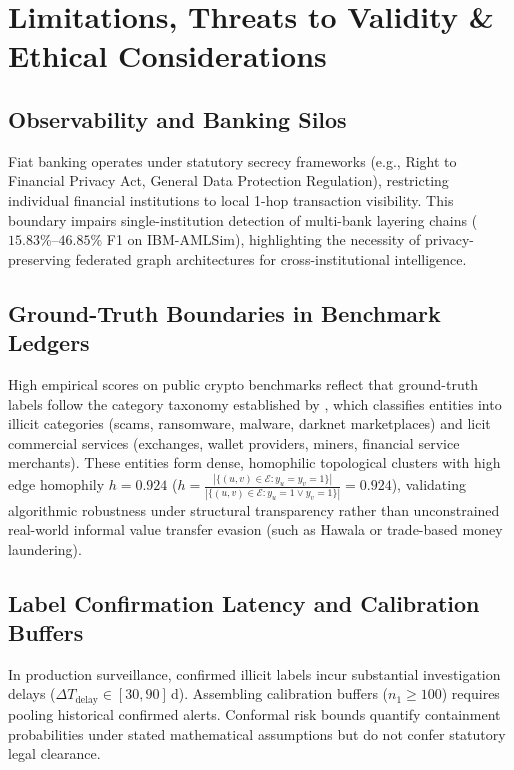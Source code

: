 \section{Limitations, Threats to Validity \& Ethical Considerations}
\label{sec:limitations}

\subsection{Observability and Banking Silos}
\label{sec:limitations_observability}
Fiat banking operates under statutory secrecy frameworks (e.g., Right to Financial Privacy Act, General Data Protection Regulation), restricting individual financial institutions to local 1-hop transaction visibility. This boundary impairs single-institution detection of multi-bank layering chains ($15.83\%$--$46.85\%$ F1 on IBM-AMLSim), highlighting the necessity of privacy-preserving federated graph architectures for cross-institutional intelligence.

\subsection{Ground-Truth Boundaries in Benchmark Ledgers}
\label{sec:limitations_ground_truth}
High empirical scores on public crypto benchmarks reflect that ground-truth labels follow the category taxonomy established by \citet{weber2019anti}, which classifies entities into illicit categories (scams, ransomware, malware, darknet marketplaces) and licit commercial services (exchanges, wallet providers, miners, financial service merchants). These entities form dense, homophilic topological clusters with high edge homophily $h = 0.924$ ($h = \frac{|\{(u, v) \in \mathcal{E} : y_u = y_v = 1\}|}{|\{(u, v) \in \mathcal{E} : y_u = 1 \lor y_v = 1\}|} = 0.924$), validating algorithmic robustness under structural transparency rather than unconstrained real-world informal value transfer evasion (such as Hawala or trade-based money laundering).

\subsection{Label Confirmation Latency and Calibration Buffers}
\label{sec:limitations_label_latency}
In production surveillance, confirmed illicit labels incur substantial investigation delays ($\Delta T_{\text{delay}} \in [30, 90]$\,d). Assembling calibration buffers ($n_1 \ge 100$) requires pooling historical confirmed alerts. Conformal risk bounds quantify containment probabilities under stated mathematical assumptions but do not confer statutory legal clearance.

